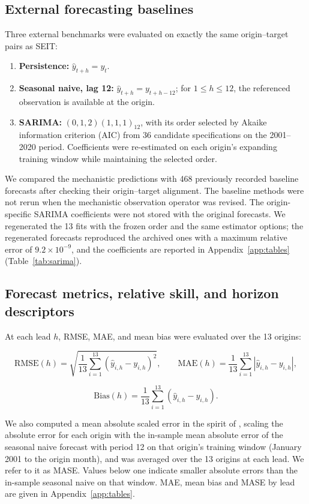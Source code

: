 \documentclass[pdflatex,sn-mathphys-ay,lineno]{sn-jnl}
\begin{document}
\subsection{External forecasting baselines}

Three external benchmarks were evaluated on exactly the same origin--target pairs as SEIT:

\begin{enumerate}
\item \textbf{Persistence:} $\widehat y_{t+h}=y_t$.
\item \textbf{Seasonal naive, lag 12:} $\widehat y_{t+h}=y_{t+h-12}$; for $1\le h\le12$, the referenced observation is available at the origin.
\item \textbf{SARIMA:} $(0,1,2)(1,1,1)_{12}$, with its order selected by Akaike information criterion (AIC) from 36 candidate specifications on the 2001--2020 period. Coefficients were re-estimated on each origin's expanding training window while maintaining the selected order.
\end{enumerate}

We compared the mechanistic predictions with 468 previously recorded baseline forecasts after checking their origin--target alignment. The baseline methods were not rerun when the mechanistic observation operator was revised. The origin-specific SARIMA coefficients were not stored with the original forecasts. We regenerated the 13 fits with the frozen order and the same estimator options; the regenerated forecasts reproduced the archived ones with a maximum relative error of $9.2\times10^{-9}$, and the coefficients are reported in Appendix~\ref{app:tables} (Table~\ref{tab:sarima}).

\subsection{Forecast metrics, relative skill, and horizon descriptors}

At each lead $h$, RMSE, MAE, and mean bias were evaluated over the 13 origins:

\[
\mathrm{RMSE}(h)=\sqrt{\frac1{13}\sum_{i=1}^{13}(\widehat y_{i,h}-y_{i,h})^2},\qquad
\mathrm{MAE}(h)=\frac1{13}\sum_{i=1}^{13}|\widehat y_{i,h}-y_{i,h}|,
\]

\[
\mathrm{Bias}(h)=\frac1{13}\sum_{i=1}^{13}(\widehat y_{i,h}-y_{i,h}).
\]

We also computed a mean absolute scaled error in the spirit of \citet{hyndman2006}, scaling the absolute error for each origin with the in-sample mean absolute error of the seasonal naive forecast with period 12 on that origin's training window (January 2001 to the origin month), and was averaged over the 13 origins at each lead. We refer to it as MASE. Values below one indicate smaller absolute errors than the in-sample seasonal naive on that window. MAE, mean bias and MASE by lead are given in Appendix~\ref{app:tables}.
\end{document}
